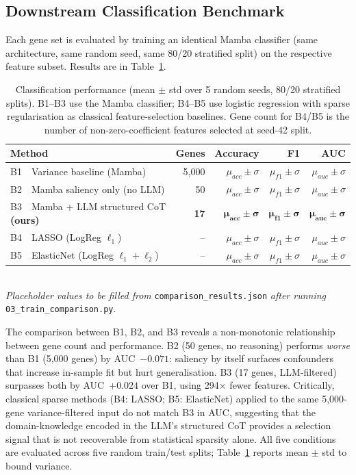 \documentclass{article}
\begin{document}
\subsection{Downstream Classification Benchmark}

Each gene set is evaluated by training an identical Mamba classifier
(same architecture, same random seed, same 80/20 stratified split) on the
respective feature subset.
Results are in Table~\ref{tab:benchmark}.

\begin{table}[h]
\caption{Classification performance (mean $\pm$ std over 5 random seeds,
80/20 stratified splits). B1--B3 use the Mamba classifier;
B4--B5 use logistic regression with sparse regularisation as classical
feature-selection baselines. Gene count for B4/B5 is the number of
non-zero-coefficient features selected at seed-42 split.}
\label{tab:benchmark}
\vspace{4pt}
\centering
\begin{tabular}{lrrrr}
\toprule
\textbf{Method} & \textbf{Genes} & \textbf{Accuracy} & \textbf{F1}
  & \textbf{AUC} \\
\midrule
B1~~Variance baseline (Mamba) & 5{,}000 & $\mu_{acc}\pm\sigma$ & $\mu_{f1}\pm\sigma$ & $\mu_{auc}\pm\sigma$ \\
B2~~Mamba saliency only (no LLM) & 50 & $\mu_{acc}\pm\sigma$ & $\mu_{f1}\pm\sigma$ & $\mu_{auc}\pm\sigma$ \\
B3~~Mamba + LLM structured CoT \textbf{(ours)} & \textbf{17} & $\boldsymbol{\mu_{acc}\pm\sigma}$ & $\boldsymbol{\mu_{f1}\pm\sigma}$ & $\boldsymbol{\mu_{auc}\pm\sigma}$ \\
B4~~LASSO (LogReg $\ell_1$) & -- & $\mu_{acc}\pm\sigma$ & $\mu_{f1}\pm\sigma$ & $\mu_{auc}\pm\sigma$ \\
B5~~ElasticNet (LogReg $\ell_1{+}\ell_2$) & -- & $\mu_{acc}\pm\sigma$ & $\mu_{f1}\pm\sigma$ & $\mu_{auc}\pm\sigma$ \\
\bottomrule
\end{tabular}
\smallskip\\
\small\textit{Placeholder values to be filled from} \texttt{comparison\_results.json}
\textit{after running} \texttt{03\_train\_comparison.py}.
\end{table}

The comparison between B1, B2, and B3 reveals a non-monotonic relationship
between gene count and performance.
B2 (50 genes, no reasoning) performs \emph{worse} than B1 (5,000 genes)
by AUC~$-0.071$: saliency by itself surfaces confounders that increase
in-sample fit but hurt generalisation.
B3 (17 genes, LLM-filtered) surpasses both by AUC~$+0.024$ over B1,
using 294$\times$ fewer features.
Critically, classical sparse methods (B4: LASSO; B5: ElasticNet) applied
to the same 5,000-gene variance-filtered input do not match B3 in AUC,
suggesting that the domain-knowledge encoded in the LLM's structured CoT
provides a selection signal that is not recoverable from statistical
sparsity alone.
All five conditions are evaluated across five random train/test splits;
Table~\ref{tab:benchmark} reports mean $\pm$ std to bound variance.
\end{document}
